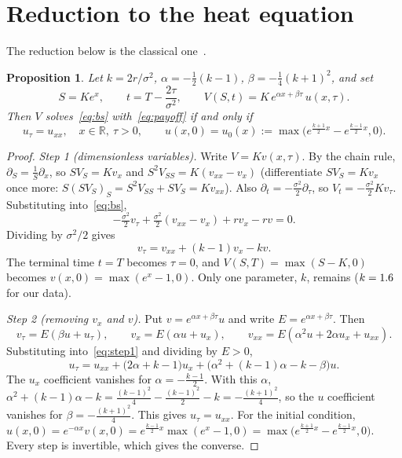 \documentclass[11pt,a4paper]{article}
\newtheorem{proposition}[theorem]{Proposition}
\theoremstyle{definition}
\theoremstyle{remark}
\begin{document}
\section{Reduction to the heat equation}\label{sec:reduction}

The reduction below is the classical one~\cite{wilmott}.


\begin{proposition}\label{prop:reduction}
Let $k=2r/\sigma^2$, $\alpha=-\tfrac12(k-1)$, $\beta=-\tfrac14(k+1)^2$, and set
\[
  S=Ke^x,\qquad t=T-\frac{2\tau}{\sigma^2},\qquad V(S,t)=K\,e^{\alpha x+\beta\tau}\,u(x,\tau).
\]
Then $V$ solves~\eqref{eq:bs} with~\eqref{eq:payoff} if and only if
\begin{equation}\label{eq:heativp}
  u_\tau=u_{xx},\quad x\in\mathbb R,\ \tau>0,\qquad
  u(x,0)=u_0(x):=\max\!\big(e^{\frac{k+1}{2}x}-e^{\frac{k-1}{2}x},0\big).
\end{equation}
\end{proposition}

\begin{proof}
\emph{Step 1 (dimensionless variables).} Write $V=Kv(x,\tau)$. By the chain rule,
$\partial_S=\frac1S\partial_x$, so $SV_S=Kv_x$ and $S^2V_{SS}=K(v_{xx}-v_x)$ (differentiate
$SV_S=Kv_x$ once more: $S(SV_S)_S=S^2V_{SS}+SV_S=Kv_{xx}$). Also $\partial_t=-\frac{\sigma^2}{2}\partial_\tau$,
so $V_t=-\frac{\sigma^2}{2}Kv_\tau$. Substituting into~\eqref{eq:bs},
\[
  -\tfrac{\sigma^2}{2}v_\tau+\tfrac{\sigma^2}{2}(v_{xx}-v_x)+rv_x-rv=0 .
\]
Dividing by $\sigma^2/2$ gives
\begin{equation}\label{eq:step1}
  v_\tau=v_{xx}+(k-1)v_x-kv .
\end{equation}
The terminal time $t=T$ becomes $\tau=0$, and $V(S,T)=\max(S-K,0)$ becomes $v(x,0)=\max(e^x-1,0)$.
Only one parameter, $k$, remains ($k=\num{1.6}$ for our data).

\emph{Step 2 (removing $v_x$ and $v$).} Put $v=e^{\alpha x+\beta\tau}u$ and write $E=e^{\alpha x+\beta\tau}$. Then
\[
  v_\tau=E(\beta u+u_\tau),\qquad v_x=E(\alpha u+u_x),\qquad v_{xx}=E(\alpha^2u+2\alpha u_x+u_{xx}).
\]
Substituting into~\eqref{eq:step1} and dividing by $E>0$,
\[
  u_\tau=u_{xx}+\big(2\alpha+k-1\big)u_x+\big(\alpha^2+(k-1)\alpha-k-\beta\big)u .
\]
The $u_x$ coefficient vanishes for $\alpha=-\frac{k-1}{2}$. With this $\alpha$,
$\alpha^2+(k-1)\alpha-k=\frac{(k-1)^2}{4}-\frac{(k-1)^2}{2}-k=-\frac{(k+1)^2}{4}$, so the $u$
coefficient vanishes for $\beta=-\frac{(k+1)^2}{4}$. This gives $u_\tau=u_{xx}$.
For the initial condition,
$u(x,0)=e^{-\alpha x}v(x,0)=e^{\frac{k-1}{2}x}\max(e^x-1,0)=\max\big(e^{\frac{k+1}{2}x}-e^{\frac{k-1}{2}x},0\big)$.
Every step is invertible, which gives the converse.
\end{proof}
\end{document}

